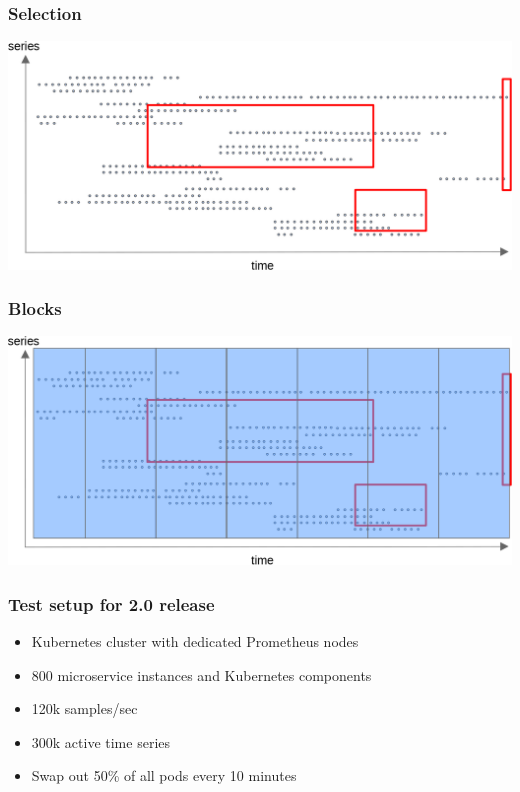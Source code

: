 \documentclass[aspectratio=169]{beamer}
\begin{document}
\begin{frame}
	\frametitle{Selection}
	\includegraphics[width=\textwidth]{storage--file_per_series_with_selection.png}
\end{frame}

\begin{frame}
	\frametitle{Blocks}
	\includegraphics[width=\textwidth]{storage--block_with_selection.png}
\end{frame}


\begin{frame}
	\frametitle{Test setup for 2.0 release}
	\begin{itemize}
		\item Kubernetes cluster with dedicated Prometheus nodes
		\item 800 microservice instances and Kubernetes components
		\item 120k samples/sec
		\item 300k active time series
		\item Swap out 50\% of all pods every 10 minutes
	\end{itemize}
\end{frame}
\end{document}
